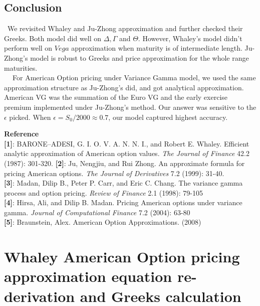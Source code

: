 \documentclass[preprint,12pt,1p]{elsarticle}
\begin{document}
\begin{spacing}{1.5}
\section{Conclusion}
\label{sec4}\
We revisited Whaley and Ju-Zhong approximation and further checked their Greeks. Both model did well on $\Delta, \Gamma$ and $\Theta$. However, Whaley's model didn't perform well on $Vega$ approximation when maturity is of intermediate length. Ju-Zhong's model is robust to Greeks and price approximation for the whole range maturities.\\
$~~~~$ For American Option pricing under Variance Gamma model, we used the same approximation structure as Ju-Zhong's did, and got analytical approximation. American VG was the summation of the Euro VG and the early exercise premium implemented under Ju-Zhong's method. Our answer was sensitive to the $\epsilon$ picked. When $\epsilon = S_0 / 2000 \approx 0.7$, our model captured highest accuracy.



\clearpage
\textbf{Reference}\\
\textbf{[1]}: BARONE--ADESI, G. I. O. V. A. N. N. I., and Robert E. Whaley. Efficient analytic approximation of American option values. \emph{The Journal of Finance} 42.2 (1987): 301-320.
\textbf{[2]}: Ju, Nengjiu, and Rui Zhong. An approximate formula for pricing American options. \emph{The Journal of Derivatives} 7.2 (1999): 31-40.\\
\textbf{[3]}: Madan, Dilip B., Peter P. Carr, and Eric C. Chang. The variance gamma process and option pricing. \emph{Review of Finance} 2.1 (1998): 79-105\\
\textbf{[4]}: Hirsa, Ali, and Dilip B. Madan. Pricing American options under variance gamma. \emph{Journal of Computational Finance} 7.2 (2004): 63-80\\
\textbf{[5]}: Braunstein, Alex. American Option Approximations. (2008)

\end{spacing}

\clearpage
\appendix

\section{Whaley American Option pricing approximation equation re-derivation and Greeks calculation}
\label{appendix-sec1}
\end{document}

